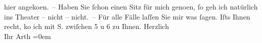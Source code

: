 \begin{ledgroupsized}[t]{13cm}
               hier angeko{\geminationm}en. – Haben Sie ſchon einen Sitz für mich
                  geno{\geminationm}en, ſo geh ich natürlich ins Theater – nicht –
               nicht. – Für alle Fälle laſſen Sie mir was ſagen. {\pb}Iſts Ihnen recht, ko{\geminationm} ich mit \textsc{S.} zwiſchen 5 u 6 zu Ihnen.\pend
           \pstart
           Herzlich{\\[\baselineskip]}Ihr \spacefill\mbox{Arth}\pend
           \leftskip=0em{}\endnumbering{}\end{ledgroupsized}  \newcommand{\dateiname}{L00469}\newcommand{\titel}{Arthur Schnitzler an Richard Beer-Hofmann, [5. 8. 1895?]}\newcommand{\editorInnen}{Martin Anton Müller und Gerd-Hermann Susen}
            \footnotesize
\begin{ledgroupsized}[t]{11.5cm}
\end{ledgroupsized}
         
      